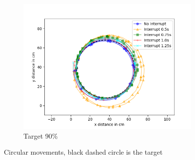 \begin{figure}
\begin{subfigure}[b]{0.62\textwidth}
		\includegraphics[width=\textwidth]{pics/circle_90.png}
		\caption{Target 90\%}
		\label{fig:circ_exp3}
	\end{subfigure}
	\caption{Circular movements, black dashed circle is the target}
\end{figure}





